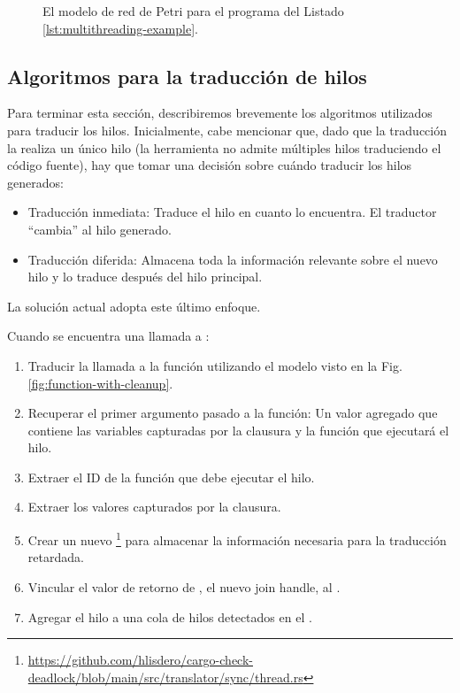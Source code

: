 \begin{figure}[!htbp]
      \centering
      
      \caption{El modelo de red de Petri para el programa del Listado \ref{lst:multithreading-example}.}
      \label{fig:multithreading-example}
\end{figure}

\subsection{Algoritmos para la traducción de hilos}

Para terminar esta sección, describiremos brevemente los algoritmos utilizados para traducir los
hilos. Inicialmente, cabe mencionar que, dado que la traducción la realiza un único hilo (la
herramienta no admite múltiples hilos traduciendo el código fuente), hay que tomar una
decisión sobre cuándo traducir los hilos generados:

\begin{itemize}
      \item Traducción inmediata: Traduce el hilo en cuanto lo encuentra. El traductor ``cambia'' al
            hilo generado.
      \item Traducción diferida: Almacena toda la información relevante sobre el nuevo hilo y lo
            traduce después del hilo principal.
\end{itemize}

La solución actual adopta este último enfoque.

Cuando se encuentra una llamada a :

\begin{enumerate}
      \item Traducir la llamada a la función utilizando el modelo visto en la Fig. \ref{fig:function-with-cleanup}.
      \item Recuperar el primer argumento pasado a la función: Un valor agregado que contiene las
            variables capturadas por la clausura y la función que ejecutará el hilo.
      \item Extraer el ID de la función que debe ejecutar el hilo.
      \item Extraer los valores capturados por la clausura.
      \item Crear un nuevo \footnote{\url{https://github.com/hlisdero/cargo-check-deadlock/blob/main/src/translator/sync/thread.rs}}
            para almacenar la información necesaria para la traducción retardada.
      \item Vincular el valor de retorno de ,
            el nuevo join handle, al .
      \item Agregar el hilo a una cola de hilos detectados en el .
\end{enumerate}

